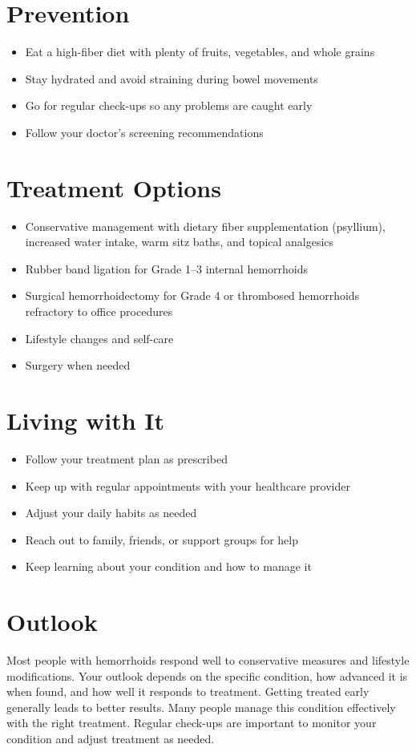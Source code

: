 \section{Prevention}

\begin{itemize}[noitemsep]
  \item Eat a high-fiber diet with plenty of fruits, vegetables, and whole grains
  \item Stay hydrated and avoid straining during bowel movements
  \item Go for regular check-ups so any problems are caught early
  \item Follow your doctor's screening recommendations
\end{itemize}

\section{Treatment Options}

\begin{itemize}[noitemsep]
  \item Conservative management with dietary fiber supplementation (psyllium), increased water intake, warm sitz baths, and topical analgesics
  \item Rubber band ligation for Grade 1--3 internal hemorrhoids
  \item Surgical hemorrhoidectomy for Grade 4 or thrombosed hemorrhoids refractory to office procedures
  \item Lifestyle changes and self-care
  \item Surgery when needed
\end{itemize}

\section{Living with It}

\begin{itemize}[noitemsep]
  \item Follow your treatment plan as prescribed
  \item Keep up with regular appointments with your healthcare provider
  \item Adjust your daily habits as needed
  \item Reach out to family, friends, or support groups for help
  \item Keep learning about your condition and how to manage it
\end{itemize}

\section{Outlook}
Most people with hemorrhoids respond well to conservative measures and lifestyle modifications. Your outlook depends on the specific condition, how advanced it is when found, and how well it responds to treatment. Getting treated early generally leads to better results. Many people manage this condition effectively with the right treatment. Regular check-ups are important to monitor your condition and adjust treatment as needed.
